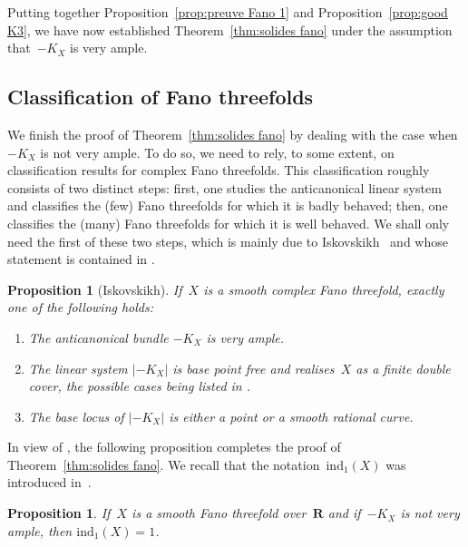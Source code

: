 \documentclass[JEP,XML,SOM,Unicode]{cedram}
\theoremstyle{plain}
\newtheorem{prop}[thm]{Proposition}
\theoremstyle{definition}
\numberwithin{equation}{section}
\newcommand{\R}{{\mathbf R}}
\newcommand{\elw}{\mathrm{ind}}
\begin{document}
Putting together Proposition~\ref{prop:preuve Fano 1}
and
Proposition~\ref{prop:good K3},
we have now established
Theorem~\ref{thm:solides fano}
under the assumption that~$-K_X$ is very ample.

\subsection{Classification of Fano threefolds}
\label{subsec:classification of fano}

We finish the proof of Theorem~\ref{thm:solides fano} by dealing with the case when $-K_X$ is not very ample. To do so, we need to rely, to some extent, on classification results for complex Fano threefolds. This classification roughly consists of two distinct steps: first, one studies the anticanonical linear system and classifies the (few) Fano threefolds for which it is badly behaved; then, one classifies the (many) Fano threefolds for which it is well behaved.
We shall only need the first of these two steps,
which is mainly due to Iskovskikh~\cite{iskovskikh} and whose statement is contained in
\cite[Th.\,2.1.16 and Prop.\,2.4.1]{fanorusse}.

\begin{prop}[Iskovskikh]
\label{prop:classification fano}
If~$X$ is a smooth complex Fano threefold, exactly one of the following holds:
\begin{enumerate}
\item The anticanonical bundle $-K_X$ is very ample.
\item The linear system $|{-}K_X|$ is base point free and realises~$X$ as a finite double cover, the possible cases being listed in \cite[Th.\,2.1.16]{fanorusse}.
\item The base locus of $|{-}K_X|$ is either a point or a smooth rational curve.
\end{enumerate}
\end{prop}

In view of \cite[Cor.\,\ref*{BW1-cor:IHC pour solides RC ou CY}]{BW1},
the following proposition completes the proof of Theorem~\ref{thm:solides fano}.
We recall that the notation~$\elw_1(X)$ was introduced in~\cite[\textsection\ref*{BW1-subsec:elw}]{BW1}.

\begin{prop}
\label{prop:preuve Fano 23}
If~$X$ is a smooth Fano threefold over~$\R$
and if~$-K_X$ is not very ample, then $\elw_1(X)=1$.
\end{prop}
\end{document}
